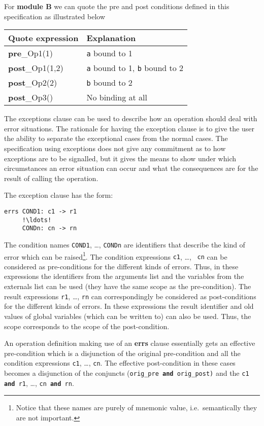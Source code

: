 \documentclass{overturerepchap}
\newcommand{\keyw}[1]{{\bf\ttfamily #1}}
\begin{document}
{\begin{description}
For \textbf{module B} we can quote the pre and post conditions defined
in this specification as illustrated below

\begin{tabular}{|p{}|p{}|} \hline
\textrm{Quote expression} & Explanation \\ \hline
\keyw{pre}\_Op1(1)     & \texttt{a} bound to 1 \\
\keyw{post}\_Op1(1,2)  & \texttt{a} bound to 1, \texttt{b} bound to 2\\
\keyw{post}\_Op2(2)    & \texttt{b} bound to 2\\
\keyw{post}\_Op3()     & No binding at all\\
\hline
\end{tabular}

\vspace{2ex}


The exceptions clause can be used to describe how an operation should
deal with error situations. The rationale for having the exception
clause is to give the user the ability to separate the exceptional
cases from the normal cases. The specification using exceptions does
not give any commitment as to how exceptions are to be signalled, but
it gives the means to show under which circumstances an error
situation can occur and what the consequences are for the result of
calling the operation.

The exception clause has the form:
\begin{lstlisting}
errs COND1: c1 -> r1
     !\ldots!
     CONDn: cn -> rn
\end{lstlisting}
The condition names {\tt COND1}, \ldots, {\tt CONDn} are identifiers
that describe the kind of error which can be raised\footnote{Notice
that these names are purely of mnemonic value, i.e.\ semantically they
are not important.}. The condition expressions {\tt c1}, \ldots, {\tt
cn} can be considered as pre-conditions for the different kinds of
errors. Thus, in these expressions the identifiers from the arguments
list and the variables from the externals list can be used (they have
the same scope as the pre-condition). The result expressions {\tt r1},
\ldots, {\tt rn} can correspondingly be considered as post-conditions
for the different kinds of errors. In these expressions the result
identifier and old values of global variables (which can be written
to) can also be used. Thus, the scope corresponds to the scope of the
post-condition.

An operation definition making use of an \keyw{errs} clause
essentially gets an effective pre-condition which is a disjunction of
the original pre-condition and all the condition expressions {\tt c1},
\ldots, {\tt cn}. The effective post-condition in these cases becomes
a disjunction of the conjuncts ({\tt orig\_pre \keyw{and} orig\_post)} and
the {\tt c1 \keyw{and} r1}, \ldots, {\tt cn \keyw{and} rn}.


\end{description}}
\end{document}
